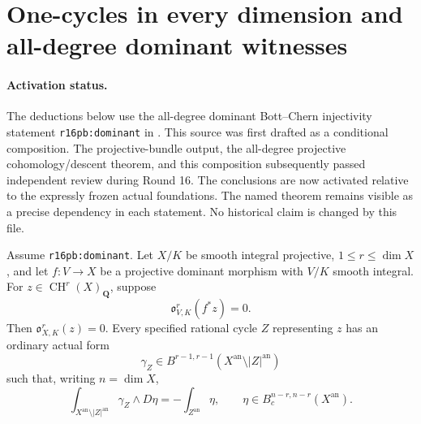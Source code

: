 \section{One-cycles in every dimension and all-degree dominant witnesses}
\label{r16G:section}

\paragraph{Activation status.}
The deductions below use the all-degree dominant Bott--Chern
injectivity statement \texttt{r16pb:dominant} in
.
This source was first drafted as a conditional composition.
The projective-bundle output, the all-degree projective
cohomology/descent theorem, and this composition subsequently
passed independent review during Round 16.  The conclusions
are now activated relative to the expressly frozen actual
foundations.  The named theorem remains visible as a precise
dependency in each statement.  No historical claim is changed
by this file.

\begin{proposition}
\label{r16G:dominant-witness}
Assume \texttt{r16pb:dominant}.  Let $X/K$ be smooth integral
projective, $1\leq r\leq\dim X$, and let $f:V\to X$ be a
projective dominant morphism with $V/K$ smooth integral.
For $z\in\operatorname{CH}^r(X)_{\mathbf Q}$, suppose
\[
                         \mathfrak o_{V,K}^r(f^*z)=0.
\tag{GC16.1}\label{r16G:upstairs}
\]
Then $\mathfrak o_{X,K}^r(z)=0$.  Every specified rational
cycle $Z$ representing $z$ has an ordinary actual form
\[
 \gamma_Z\in B^{r-1,r-1}
          (X^{\mathrm{an}}\setminus |Z|^{\mathrm{an}})
\]
such that, writing $n=\dim X$,
\[
 \int_{X^{\mathrm{an}}\setminus |Z|^{\mathrm{an}}}
                     \gamma_Z\wedge D\eta
       =-\int_{Z^{\mathrm{an}}}\eta,
       \qquad \eta\in B_c^{n-r,n-r}(X^{\mathrm{an}}).
\tag{GC16.2}\label{r16G:exact-G}
\]
\end{proposition}

